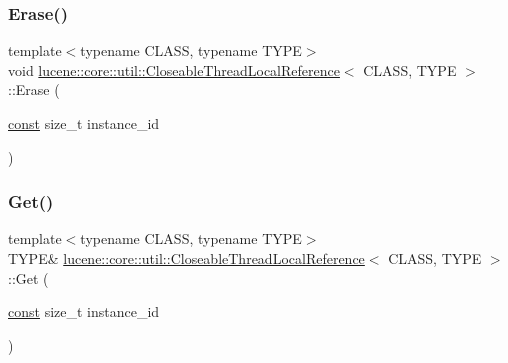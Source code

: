 \subsubsection{\texorpdfstring{Erase()}{Erase()}}
{\footnotesize\ttfamily template$<$typename C\+L\+A\+SS, typename T\+Y\+PE$>$ \\
void \mbox{\hyperlink{classlucene_1_1core_1_1util_1_1CloseableThreadLocalReference}{lucene\+::core\+::util\+::\+Closeable\+Thread\+Local\+Reference}}$<$ C\+L\+A\+SS, T\+Y\+PE $>$\+::Erase (\begin{DoxyParamCaption}\item[{\mbox{\hyperlink{ZlibCrc32_8h_a2c212835823e3c54a8ab6d95c652660e}{const}} size\+\_\+t}]{instance\+\_\+id }\end{DoxyParamCaption})\hspace{0.3cm}{\ttfamily [inline]}}

\mbox{\label{classlucene_1_1core_1_1util_1_1CloseableThreadLocalReference_a3cb386298ca2b0b974705f591b313891}} 
\subsubsection{\texorpdfstring{Get()}{Get()}}
{\footnotesize\ttfamily template$<$typename C\+L\+A\+SS, typename T\+Y\+PE$>$ \\
T\+Y\+PE\& \mbox{\hyperlink{classlucene_1_1core_1_1util_1_1CloseableThreadLocalReference}{lucene\+::core\+::util\+::\+Closeable\+Thread\+Local\+Reference}}$<$ C\+L\+A\+SS, T\+Y\+PE $>$\+::Get (\begin{DoxyParamCaption}\item[{\mbox{\hyperlink{ZlibCrc32_8h_a2c212835823e3c54a8ab6d95c652660e}{const}} size\+\_\+t}]{instance\+\_\+id }\end{DoxyParamCaption})\hspace{0.3cm}{\ttfamily [inline]}}

\mbox{\label{classlucene_1_1core_1_1util_1_1CloseableThreadLocalReference_a0492bd60f1e06eef9e03020d97bb7c91}} 
